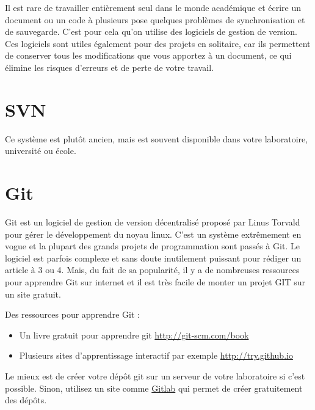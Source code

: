 Il est rare de travailler entièrement seul dans le monde académique et écrire un document ou un code à plusieurs 
pose quelques problèmes de synchronisation et de sauvegarde. C'est pour cela qu'on utilise des logiciels de gestion de version.
Ces logiciels sont utiles également pour des projets en solitaire, car ils permettent de conserver tous les modifications
que vous apportez à un document, ce qui élimine les risques d'erreurs et de perte de votre travail. 


\section{SVN}
Ce syst\`eme est plutôt ancien, mais est souvent  disponible dans votre laboratoire, université ou école.

\section{Git}

Git est un logiciel de gestion de version décentralisé proposé par Linus Torvald pour
gérer le développement du noyau linux. C'est un système extrêmement en vogue et la plupart des
 grands projets de programmation sont passés à Git. Le logiciel est parfois complexe et sans doute
 inutilement puissant pour rédiger un article à 3 ou 4. Mais, du fait de sa popularité, il y a de nombreuses
 ressources pour apprendre Git sur internet et il est très facile de monter un projet GIT sur un site gratuit.
 
 
 Des ressources pour apprendre Git :
 \begin{itemize}
  \item Un livre gratuit pour apprendre git \url{http://git-scm.com/book}
  \item Plusieurs sites d'apprentissage interactif par exemple  \url{http://try.github.io}
 \end{itemize}

 
 Le mieux est de créer votre dépôt git sur un serveur de votre laboratoire si c'est possible.
 Sinon, utilisez un site comme \href{http://gitlab.org/}{Gitlab} qui permet de créer gratuitement des dépôts.